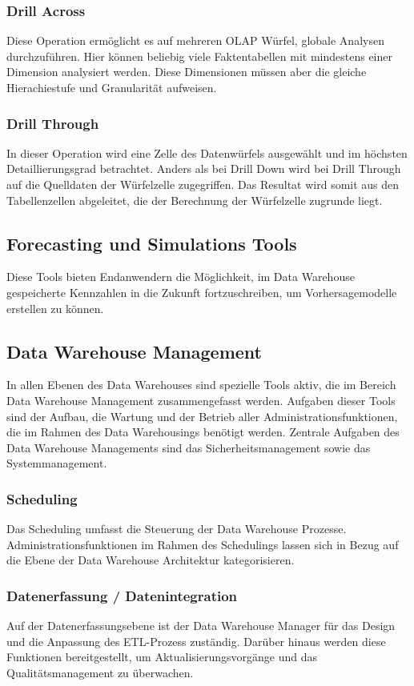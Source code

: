\subsubsection{Drill Across}\label{ssec:Drill-Across}
Diese Operation ermöglicht es auf mehreren OLAP Würfel, globale Analysen durchzuführen. Hier können beliebig viele Faktentabellen mit mindestens einer Dimension analysiert werden. Diese Dimensionen müssen aber die gleiche Hierachiestufe und Granularität aufweisen. 
\subsubsection{Drill Through}\label{ssec:Drill-Through}
In dieser Operation wird eine Zelle des Datenwürfels ausgewählt und im höchsten Detaillierungsgrad betrachtet. Anders als bei Drill Down wird bei Drill Through auf die Quelldaten der Würfelzelle zugegriffen. Das Resultat wird somit aus den Tabellenzellen abgeleitet, die der Berechnung der Würfelzelle zugrunde liegt.
\subsection{Forecasting und Simulations Tools}\label{ssec:Forecasting-Tools}
Diese Tools bieten Endanwendern die Möglichkeit, im Data Warehouse gespeicherte Kennzahlen in die Zukunft fortzuschreiben, um Vorhersagemodelle erstellen zu können. 
\newpage
\subsection{Data Warehouse Management}
In allen Ebenen des Data Warehouses sind spezielle Tools aktiv, die im Bereich Data Warehouse Management zusammengefasst werden. Aufgaben dieser Tools sind der Aufbau, die Wartung und der Betrieb aller Administrationsfunktionen, die im Rahmen des Data Warehousings benötigt werden. Zentrale Aufgaben des Data Warehouse Managements sind das Sicherheitsmanagement sowie das Systemmanagement.
\subsubsection{Scheduling}\label{ssec:Scheduling}
Das Scheduling umfasst die Steuerung der Data Warehouse Prozesse. Administrationsfunktionen im Rahmen des Schedulings lassen sich in Bezug auf die Ebene der Data Warehouse Architektur kategorisieren.
\subsubsection{Datenerfassung / Datenintegration}\label{ssec:Datenerfassung}
Auf der Datenerfassungsebene ist der Data Warehouse Manager für das Design und die Anpassung des ETL-Prozess zuständig. Darüber hinaus werden diese Funktionen bereitgestellt, um Aktualisierungsvorgänge und das Qualitätsmanagement zu überwachen.

